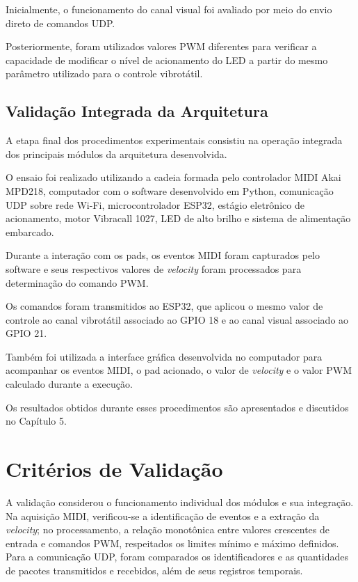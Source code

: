 Inicialmente, o funcionamento do canal visual foi avaliado por meio do envio direto de comandos UDP.

Posteriormente, foram utilizados valores PWM diferentes para verificar a capacidade de modificar o nível de acionamento do LED a partir do mesmo parâmetro utilizado para o controle vibrotátil.


\subsection{Validação Integrada da Arquitetura}

A etapa final dos procedimentos experimentais consistiu na operação integrada dos principais módulos da arquitetura desenvolvida.

O ensaio foi realizado utilizando a cadeia formada pelo controlador MIDI Akai MPD218, computador com o software desenvolvido em Python, comunicação UDP sobre rede Wi-Fi, microcontrolador ESP32, estágio eletrônico de acionamento, motor Vibracall 1027, LED de alto brilho e sistema de alimentação embarcado.

Durante a interação com os pads, os eventos MIDI foram capturados pelo software e seus respectivos valores de \textit{velocity} foram processados para determinação do comando PWM.

Os comandos foram transmitidos ao ESP32, que aplicou o mesmo valor de controle ao canal vibrotátil associado ao GPIO 18 e ao canal visual associado ao GPIO 21.

Também foi utilizada a interface gráfica desenvolvida no computador para acompanhar os eventos MIDI, o pad acionado, o valor de \textit{velocity} e o valor PWM calculado durante a execução.

Os resultados obtidos durante esses procedimentos são apresentados e discutidos no Capítulo 5.

\section{Critérios de Validação}
\label{sec:criterios_validacao}

A validação considerou o funcionamento individual dos módulos e sua integração. Na aquisição MIDI, verificou-se a identificação de eventos e a extração da \textit{velocity}; no processamento, a relação monotônica entre valores crescentes de entrada e comandos PWM, respeitados os limites mínimo e máximo definidos. Para a comunicação UDP, foram comparados os identificadores e as quantidades de pacotes transmitidos e recebidos, além de seus registros temporais.

